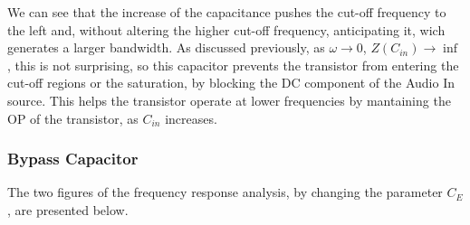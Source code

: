 \pagebreak

We can see that the increase of the capacitance pushes the cut-off frequency to the left and, without altering the higher cut-off frequency, anticipating it, wich generates a larger bandwidth.
As discussed previously, as $\omega \to 0$, $Z(C_{in}) \to \inf$, this is not surprising, so this capacitor prevents the transistor from entering the cut-off regions or the saturation, by blocking the DC component of the Audio In source. This helps the transistor operate at lower frequencies by mantaining the OP of the transistor, as $C_{in}$ increases.

\subsubsection{Bypass Capacitor}

The two figures of the frequency response analysis, by changing the parameter $C_E$, are presented below.

